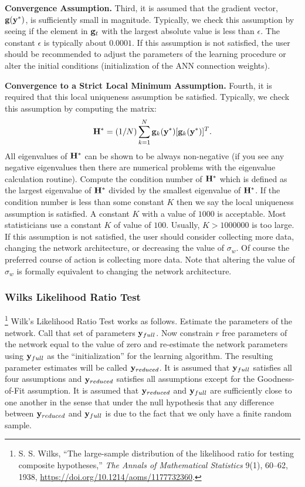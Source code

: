 \documentclass{report}
\begin{document}
{\bf Convergence Assumption.}
Third, it is assumed that the gradient vector, ${\bf g}({\bf y}^*)$,
is sufficiently small in magnitude. Typically, we check this
assumption by seeing if the element in ${\bf g}_t$ with the largest
absolute value is less than $\epsilon$. The constant $\epsilon$ is
typically about $0.0001$.  If this assumption is not satisfied, the
user should be recommended to adjust the parameters of the learning
procedure or alter the initial conditions (initialization of the ANN
connection weights).

{\bf Convergence to a Strict Local Minimum Assumption.}
Fourth, it is required that this local uniqueness assumption be
satisfied. Typically, we check this assumption by computing the
matrix:
\begin{equation}
\label{hessavg}
{\bf H}^* = (1/N) \sum_{k=1}^N {\bf g}_k({\bf y}^*) [{\bf g}_k({\bf y}
^*)]^T.
\end{equation}
All eigenvalues of ${\bf H}^*$ can be shown to be always non-negative
(if you see any negative eigenvalues then there are numerical problems
with the eigenvalue calculation routine). Compute the condition number
of ${\bf H}^*$ which is defined as the largest eigenvalue of ${\bf
H}^*$ divided by the smallest eigenvalue of ${\bf H}^*$. If the
condition number is less than some constant $K$ then we say the local
uniqueness assumption is satisfied. A constant $K$ with a value of
$1000$ is acceptable.  Most statisticians use a constant $K$ of value
of $100$.  Usually, $K > 1000000$ is too large. If this assumption is
not satisfied, the user should consider collecting more data, changing
the network architecture, or decreasing the value of $\sigma_w$. Of
course the preferred course of action is collecting more data. Note
that altering the value of $\sigma_w$ is formally equivalent to
changing the network architecture.

\subsubsection{Wilks Likelihood Ratio Test}\label{Wilks}
\footnote{S. S. Wilks, ``The large-sample distribution of the likelihood ratio
for testing composite hypotheses,'' \emph{The Annals of Mathematical
Statistics} 9(1), 60--62, 1938,
\url{https://doi.org/10.1214/aoms/1177732360}.}
Wilk's Likelihood Ratio Test works as follows. Estimate the parameters
of the network. Call that set of parameters ${\bf y}_{full}$. Now
constrain $r$ free parameters of the network equal to the value of
zero and re-estimate the network parameters using ${\bf y}_{full}$ as
the ``initialization'' for the learning algorithm. The resulting
parameter estimates will be called ${\bf y}_{reduced}$. It is assumed
that ${\bf y}_{full}$ satisfies all four assumptions and ${\bf
y}_{reduced}$ satisfies all assumptions except for the Goodness-of-Fit
assumption. It is assumed that ${\bf y}_{reduced}$ and ${\bf
y}_{full}$ are sufficiently close to one another in the sense that
under the null hypothesis that any difference between ${\bf
y}_{reduced}$ and ${\bf y}_{full}$ is due to the fact that we only
have a finite random sample.
\end{document}
